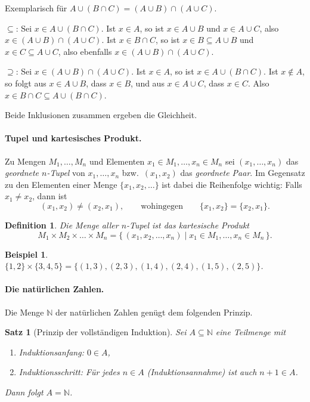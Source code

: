 \documentclass[a4paper]{article}
\makeatletter
\theoremstyle{kurzskript}
\newtheorem{satz}{Satz}[section]             %
\newtheorem*{bsp}{Beispiel}
\newtheorem*{defn}{Definition}
\renewenvironment{proof}[1][\proofname]{\par\pushQED{\qed}%
  \normalfont\topsep\medskipamount\relax
  \trivlist\item[\hskip\labelsep\bfseries #1\@addpunct{.}]\ignorespaces}%
  {\popQED\endtrivlist\@endpefalse}
\renewcommand{\proofname}{Beweis}
\newcommand{\N}{\mathbb{N}}
\makeatother
\begin{document}
\begin{proof}
Exemplarisch für $A \cup (B \cap C) = (A \cup B) \cap (A \cup C)$.

\glqq$\subseteq$\grqq: Sei $x \in A \cup (B \cap C)$. Ist $x \in A$, so ist $x \in A \cup B$ und $x \in A \cup C$, also $x \in (A \cup B) \cap (A \cup C)$. Ist $x \in B \cap C$, so ist $x \in B \subseteq A \cup B$ und $x \in C \subseteq A \cup C$, also ebenfalls $x \in (A \cup B) \cap (A \cup C)$.

\glqq$\supseteq$\grqq: Sei $x \in (A \cup B) \cap (A \cup C)$. Ist $x \in A$, so ist $x \in A \cup (B \cap C)$. Ist $x \notin A$, so folgt aus $x \in A \cup B$, dass $x \in B$, und aus $x \in A \cup C$, dass $x \in C$. Also $x \in B \cap C \subseteq A \cup (B \cap C)$.

Beide Inklusionen zusammen ergeben die Gleichheit.
\end{proof}

\paragraph{Tupel und kartesisches Produkt.}
Zu Mengen $M_1, \dots, M_n$ und Elementen $x_1 \in M_1, \dots, x_n \in M_n$ sei $(x_1, \dots, x_n)$ das \emph{geordnete $n$-Tupel} von $x_1, \dots, x_n$ bzw.\ $(x_1, x_2)$ das \emph{geordnete Paar}. Im Gegensatz zu den Elementen einer Menge $\{x_1, x_2, \dots\}$ ist dabei die Reihenfolge wichtig: Falls $x_1 \neq x_2$, dann ist
\[
  (x_1, x_2) \neq (x_2, x_1), \qquad\text{wohingegen}\qquad \{x_1, x_2\} = \{x_2, x_1\}.
\]

\begin{defn}
Die Menge aller $n$-Tupel ist das \emph{kartesische Produkt}
\[
  M_1 \times M_2 \times \dots \times M_n = \{\, (x_1, x_2, \dots, x_n) \mid x_1 \in M_1, \dots, x_n \in M_n \,\}.
\]
\end{defn}

\begin{bsp}
$\{1, 2\} \times \{3, 4, 5\} = \{(1, 3), (2, 3), (1, 4), (2, 4), (1, 5), (2, 5)\}$.
\end{bsp}

\paragraph{Die natürlichen Zahlen.}
Die Menge $\N$ der natürlichen Zahlen genügt dem folgenden Prinzip.

\begin{satz}[Prinzip der vollständigen Induktion]
Sei $A \subseteq \N$ eine Teilmenge mit
\begin{enumerate}[label=(\arabic*)]
  \item \emph{Induktionsanfang:} $0 \in A$,
  \item \emph{Induktionsschritt:} Für jedes $n \in A$ \textup{(}\emph{Induktionsannahme}\textup{)} ist auch $n + 1 \in A$.
\end{enumerate}
Dann folgt $A = \N$.
\end{satz}
\end{document}
